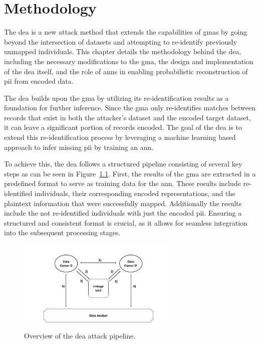 \chapter{Methodology}  \label{sec:method}
The \ac{dea} is a new attack method that extends the capabilities of \ac{gma}s by going beyond the intersection of datasets and attempting to re-identify previously unmapped individuals.
This chapter details the methodology behind the \ac{dea}, including the necessary modifications to the \ac{gma}, the design and implementation of the \ac{dea} itself, and the role of \ac{ann}s in enabling probabilistic reconstruction of \ac{pii} from encoded data.

The \ac{dea} builds upon the \ac{gma} by utilizing its re-identification results as a foundation for further inference.
Since the \ac{gma} only re-identifies matches between records that exist in both the attacker’s dataset and the encoded target dataset, it can leave a significant portion of records encoded.
The goal of the \ac{dea} is to extend this re-identification process by leveraging a machine learning based approach to infer missing \ac{pii} by training an \ac{ann}.

To achieve this, the \ac{dea} follows a structured pipeline consisting of several key steps as can be seen in Figure~\ref{fig:deaoverview}.
First, the results of the \ac{gma} are extracted in a predefined format to serve as training data for the \ac{ann}.
These results include re-identified individuals, their corresponding encoded representations, and the plaintext information that were successfully mapped.
Additionally the results include the not re-identified individuals with just the encoded \ac{pii}.
Ensuring a structured and consistent format is crucial, as it allows for seamless integration into the subsequent processing stages.

\begin{figure}[H]
    \centering
    \includegraphics[width=0.7\textwidth, page=14]{img/visualization.pdf}
    \caption{Overview of the \ac{dea} attack pipeline.}
    \label{fig:deaoverview}
  \end{figure}

